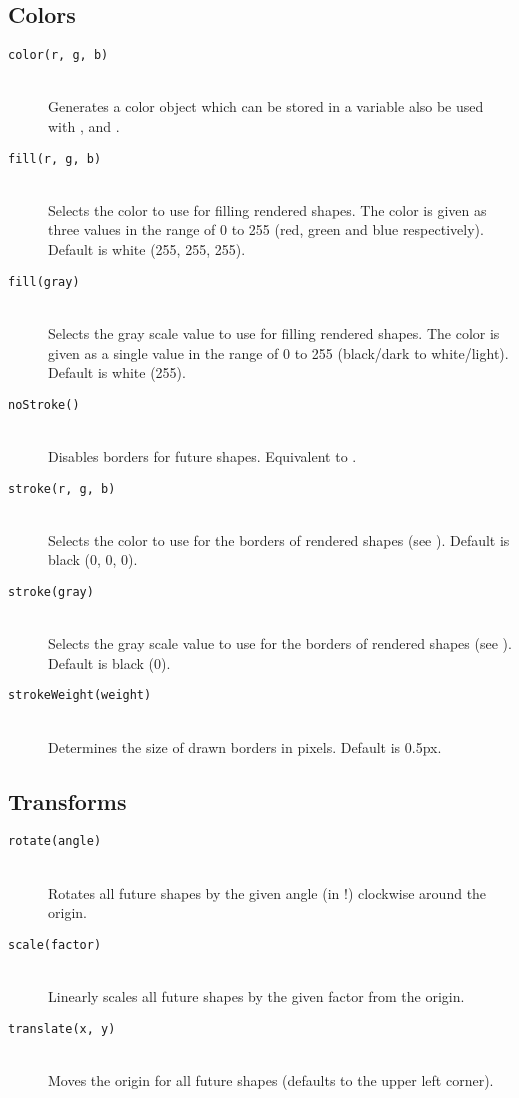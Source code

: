 \subsection{Colors}
\begin{description}
\item[\texttt{color(r, g, b)}] \hfill \\
	Generates a color object which can be stored in a variable also be used with ,  and .
\item[\texttt{fill(r, g, b)}] \hfill \\
	Selects the color to use for filling rendered shapes. The color is given as three values in the range of 0 to 255 (red, green and blue respectively). Default is white (255, 255, 255).
\item[\texttt{fill(gray)}] \hfill \\
	Selects the gray scale value to use for filling rendered shapes. The color is given as a single value in the range of 0 to 255 (black/dark to white/light). Default is white (255).
\item[\texttt{noStroke()}] \hfill \\
	Disables borders for future shapes. Equivalent to .
\item[\texttt{stroke(r, g, b)}] \hfill \\
	Selects the color to use for the borders of rendered shapes (see ). Default is black (0, 0, 0).
\item[\texttt{stroke(gray)}] \hfill \\
	Selects the gray scale value to use for the borders of rendered shapes (see ). Default is black (0).
\item[\texttt{strokeWeight(weight)}] \hfill \\
	Determines the size of drawn borders in pixels. Default is 0.5px.
\end{description}

\subsection{Transforms}
\begin{description}
\item[\texttt{rotate(angle)}] \hfill \\
	Rotates all future shapes by the given angle (in !) clockwise around the origin.
\item[\texttt{scale(factor)}] \hfill \\
	Linearly scales all future shapes by the given factor from the origin.
\item[\texttt{translate(x, y)}] \hfill \\
	Moves the origin  for all future shapes (defaults to the upper left corner).
\end{description}

